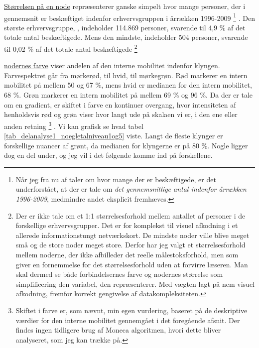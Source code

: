 \underline{Størrelsen på en node} repræsenterer ganske simpelt hvor mange personer, der i gennemsnit er beskæftiget indenfor erhvervsgruppen i årrækken 1996-2009%
%
\footnote{Når jeg fra nu af taler om hvor mange der er beskæftigede, er det underforstået, at der er tale om \emph{det gennemsnitlige antal indenfor årrækken 1996-2009}, medmindre andet eksplicit fremhæves.}%
%
. Den største erhvervsgruppe, , indeholder 114.869 personer, svarende til 4,9 \% af det totale antal beskæftigede. Mens den mindste,  indeholder 504 personer, svarende til 0,02 \% af det totale antal beskæftigede
%
\footnote{Der er ikke tale om et 1:1 størrelsesforhold mellem antallet af personer i de forskellige erhvervsgrupper. Det er for komplekst til visuel afkodning i et allerede informationstungt netværkskort. De mindste noder ville blive meget små og de store noder meget store. Derfor har jeg valgt et størrelsesforhold mellem noderne, der ikke afbilleder det reelle målestoksforhold, men som giver en fornemmelse for det størrelsesforhold uden at forvirre læseren. Man skal dermed se både forbindelsernes farve og nodernes størrelse som simplificering den variabel, den repræsenterer. Med vægten lagt på nem visuel afkodning, fremfor korrekt gengivelse af datakompleksiteten.}%
%


\underline{nodernes farve} viser andelen af den interne mobilitet indenfor klyngen. Farvespektret går fra mørkerød, til hvid, til mørkegrøn. Rød markerer en intern mobilitet på mellem 50 og 67 \%, mens hvid er medianen for den intern mobilitet, 68 \%. Grøn markerer en intern mobilitet på mellem 69 \% og 96 \%.  Da der er tale om en gradient, er skiftet i farve en kontinuer overgang, hvor intensiteten af henholdsvis rød og grøn viser hvor langt ude på skalaen vi er, i den ene eller anden retning
%
\footnote{ Skiftet i farve er, som nævnt, min egen vurdering, baseret på de deskriptive værdier for den interne mobilitet gennemgået i det foregående afsnit. Der findes ingen tidligere brug af Moneca algoritmen, hvori dette bliver analyseret, som jeg kan trække på.}%
%
. Vi kan grafisk se hvad tabel \ref{tab_delanalyse1_noegletalniveau1og5} viste. Langt de fleste klynger er forskellige nuancer af grønt, da medianen for klyngerne er på 80 \%. Nogle ligger dog en del under, og jeg vil i det følgende komme ind på forskellene.  

